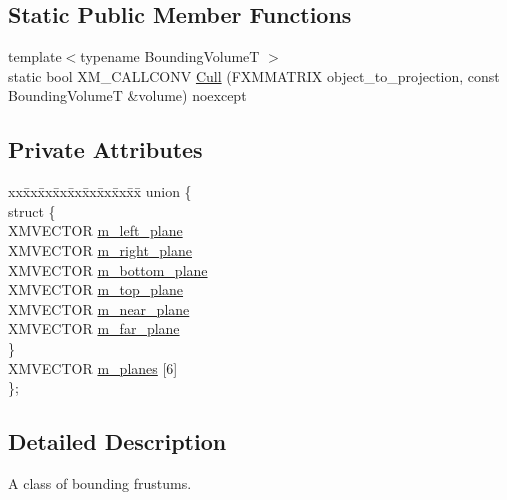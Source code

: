 \subsection*{Static Public Member Functions}
\begin{DoxyCompactItemize}
\item 
{\footnotesize template$<$typename Bounding\+VolumeT $>$ }\\static bool X\+M\+\_\+\+C\+A\+L\+L\+C\+O\+NV \hyperlink{classmage_1_1_bounding_frustum_af2080fda86e99ae8dda866b7a90f84a1}{Cull} (F\+X\+M\+M\+A\+T\+R\+IX object\+\_\+to\+\_\+projection, const Bounding\+VolumeT \&volume) noexcept
\end{DoxyCompactItemize}
\subsection*{Private Attributes}
\begin{DoxyCompactItemize}
\item 
\begin{tabbing}
xx\=xx\=xx\=xx\=xx\=xx\=xx\=xx\=xx\=\kill
union \{\\
\>struct \{\\
\>\>XMVECTOR \hyperlink{classmage_1_1_bounding_frustum_ae9ce2430295e49fe9dff4940fa9aafb1}{m\_left\_plane}\\
\>\>XMVECTOR \hyperlink{classmage_1_1_bounding_frustum_a28a9d13ade71eb4253e452e6c53c31fe}{m\_right\_plane}\\
\>\>XMVECTOR \hyperlink{classmage_1_1_bounding_frustum_ae416db4ef5c2fc3eb2e2f25f6e45e747}{m\_bottom\_plane}\\
\>\>XMVECTOR \hyperlink{classmage_1_1_bounding_frustum_acea4c43991bf09de647f7ee70feb1fff}{m\_top\_plane}\\
\>\>XMVECTOR \hyperlink{classmage_1_1_bounding_frustum_abd4fa19a2fa0e88342ab4bc2726bf885}{m\_near\_plane}\\
\>\>XMVECTOR \hyperlink{classmage_1_1_bounding_frustum_a8a1841dcd6c7fdbecbd1dd5c39558e8e}{m\_far\_plane}\\
\>\} \\
\>XMVECTOR \hyperlink{classmage_1_1_bounding_frustum_a077e9ac802e5272dd9cf60a57546505c}{m\_planes} \mbox{[}6\mbox{]}\\
\}; \\

\end{tabbing}\end{DoxyCompactItemize}


\subsection{Detailed Description}
A class of bounding frustums. 

